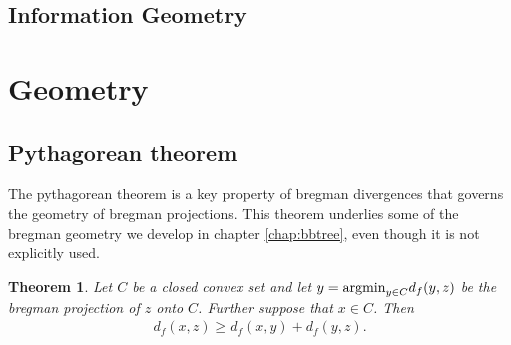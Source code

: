 \documentclass{article}
\newtheorem{theorem}{Theorem}
\newcommand{\argmin}{\mbox{\textup{argmin}}}
\begin{document}
\subsection{Information Geometry}


\section{Geometry}
\subsection{Pythagorean theorem}
The pythagorean theorem is a key property of bregman divergences that
governs the geometry of bregman projections.  This theorem 
underlies some of the bregman geometry we develop in chapter
\ref{chap:bbtree}, even though it is not explicitly used.  
\begin{theorem} Let $C$ be a closed convex set and let $y = \argmin_{y \in C}
  d_f(y,z)$ be the bregman projection of $z$ onto $C$.  Further suppose
  that $x\in C$.  Then 
\begin{align*}
d_f(x,z) \geq d_f(x,y) + d_f(y,z).
\end{align*} \label{thm:pythagineq}
\end{theorem} 
\end{document}
